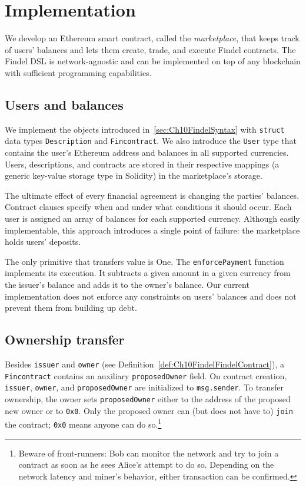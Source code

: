 \section{Implementation} \label{sec:Ch10FindelImplementation}

We develop an Ethereum smart contract, called the \textit{marketplace}, that keeps track of users' balances and lets them create, trade, and execute Findel contracts.
The Findel DSL is network-agnostic and can be implemented on top of any blockchain with sufficient programming capabilities.


\subsection{Users and balances}

We implement the objects introduced in~\ref{sec:Ch10FindelSyntax} with \texttt{struct} data types \texttt{Description} and \texttt{Fincontract}.
We also introduce the \texttt{User} type that contains the user's Ethereum address and balances in all supported currencies.
Users, descriptions, and contracts are stored in their respective mappings (a generic key-value storage type in Solidity) in the marketplace's storage.

The ultimate effect of every financial agreement is changing the parties' balances.
Contract clauses specify when and under what conditions it should occur.
Each user is assigned an array of balances for each supported currency.
Although easily implementable, this approach introduces a single point of failure: the marketplace holds users' deposits.

The only primitive that transfers value is \(\mathrm{One}\).
The \texttt{enforcePayment} function implements its execution.
It subtracts a given amount in a given currency from the issuer's balance and adds it to the owner's balance.
Our current implementation does not enforce any constraints on users' balances and does not prevent them from building up debt.


\subsection{Ownership transfer}

Besides \texttt{issuer} and \texttt{owner} (see Definition~\ref{def:Ch10FindelFindelContract}), a \texttt{Fincontract} contains an auxiliary \texttt{proposedOwner} field.
On contract creation, \texttt{issuer}, \texttt{owner}, and \texttt{proposedOwner} are initialized to \texttt{msg.sender}.
To transfer ownership, the owner sets \texttt{proposedOwner} either to the address of the proposed new owner or to \texttt{0x0}.
Only the proposed owner can (but does not have to) \texttt{join} the contract; \texttt{0x0} means anyone can do so.\footnote{Beware of front-runners: Bob can monitor the network and try to join a contract as soon as he sees Alice's attempt to do so. Depending on the network latency and miner's behavior, either transaction can be confirmed.}


